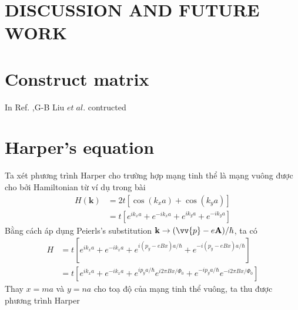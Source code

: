 \documentclass{report}
\begin{document}
\chapter{DISCUSSION AND FUTURE WORK}






\nocite{*}
\renewcommand{\bibname}{REFERENCES}


\appendix
\renewcommand{\chaptername}{Appendix}
\chapter{Construct matrix}
In Ref. \cite{PhysRevB.88.085433},G-B Liu $et \; al$. contructed


\chapter{Harper's equation} \label{appendix b}
Ta xét phương trình Harper cho trường hợp mạng tinh thể là mạng vuông được cho bởi Hamiltonian từ ví dụ trong bài \cite{yalcin_2019}
\begin{equation}
	\begin{aligned}
		H(\mathbf{k})
		 & = 2 t \left[\cos(k_{x} a) + \cos(k_{y} a)\right]                               \\
		 & = t \left[ e^{ik_{x} a} + e^{-ik_{x} a} + e^{ik_{y} a} + e^{-ik_{y} a} \right]
	\end{aligned}
\end{equation}
Bằng cách áp dụng Peierls's substitution $\mathbf{k} \rightarrow (\vv{p} - e \mathbf{A}) / \hbar$, ta có
\begin{equation}
	\begin{aligned}
		H & = t \left[ e^{ik_{x} a} + e^{-ik_{x} a} + e^{i (p_{y} - e Bx) a/\hbar} + e^{-i (p_{y} - e Bx) a/\hbar} \right]                                    \\
		  & = t \left[ e^{ik_{x} a} + e^{-ik_{x} a} + e^{i p_{y} a/\hbar} e^{i 2 \pi Bx / \Phi_{0}} + e^{-i p_{y} a/\hbar} e^{-i 2 \pi Bx / \Phi_{0}} \right]
	\end{aligned}
\end{equation}
Thay $x = ma$ và $y = na$ cho toạ độ của mạng tinh thể vuông, ta thu được phương trình Harper
\end{document}
